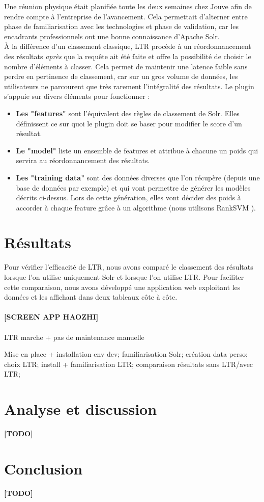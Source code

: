 \documentclass[twocolumn,a4paper]{IEEEtranfr}
\begin{document}
Une réunion physique était planifiée toute les deux semaines chez Jouve afin de rendre compte à l'entreprise de l'avancement. Cela permettait d'alterner entre phase de familiarisation avec les technologies et phase de validation, car les encadrants professionnels ont une bonne connaissance d'Apache Solr.\\

À la différence d'un classement classique, LTR procède à un réordonnancement des résultats \textit{après} que la requête ait été faite et offre la possibilité de choisir le nombre d'éléments à classer. Cela permet de maintenir une latence faible sans perdre en pertinence de classement, car sur un gros volume de données, les utilisateurs ne parcourent que très rarement l'intégralité des résultats. 
Le plugin s'appuie sur divers éléments pour fonctionner : 
\begin{itemize}
  \item \textbf{Les "features"} sont l'équivalent des règles de classement de Solr. Elles définissent ce sur quoi le plugin doit se baser pour modifier le score d'un résultat.
  \item \textbf{Le "model"} liste un ensemble de features et attribue à chacune un poids qui servira au réordonnancement des résultats.
  \item \textbf{Les "training data"} sont des données diverses que l'on récupère (depuis une base de données par exemple) et qui vont permettre de générer les modèles décrits ci-dessus. Lors de cette génération, elles vont décider des poids à accorder à chaque feature grâce à un algorithme (nous utilisons RankSVM \cite{rankSVM}).
\end{itemize}




\section{Résultats}
Pour vérifier l'efficacité de LTR, nous avons comparé le classement des résultats lorsque l'on utilise uniquement Solr et lorsque l'on utilise LTR. Pour faciliter cette comparaison, nous avons développé une application web exploitant les données et les affichant dans deux tableaux côte à côte.
\\\\
\textbf{[SCREEN APP HAOZHI]}
\\\\
LTR marche + pas de maintenance manuelle

Mise en place + installation env dev; familiarisation Solr; création data perso; choix LTR; install + familiarisation LTR; comparaison résultats sans LTR/avec LTR;

\section{Analyse et discussion}
\textbf{[TODO]}

\section{Conclusion}
\textbf{[TODO]}





\end{document}
